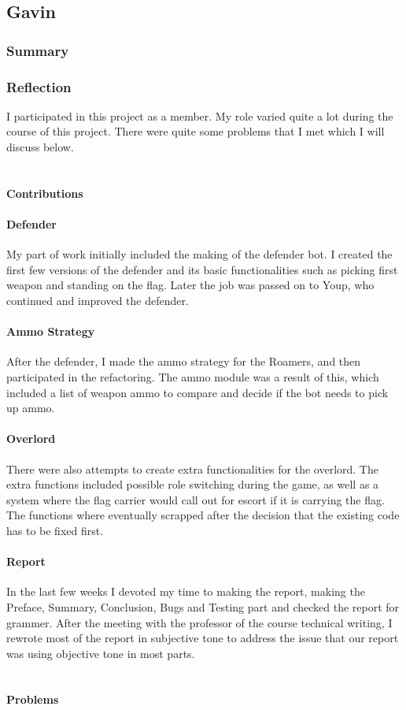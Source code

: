 \newpage
\subsection{Gavin}
\subsubsection{Summary}
\subsubsection{Reflection}
I participated in this project as a member. My role varied quite a lot during the course of this project. There were quite some problems that I met which I will discuss below.\\
\\
\\
\noindent
\textbf{Contributions}\\
\paragraph{Defender}
My part of work initially included the making of the defender bot. I created the first few versions of the defender and its basic functionalities such as picking first weapon and standing on the flag. Later the job was passed on to Youp, who continued and improved the defender.
\paragraph{Ammo Strategy}
After the defender, I made the ammo strategy for the Roamers, and then participated in the refactoring. The ammo module was a result of this, which included a list of weapon ammo to compare and decide if the bot needs to pick up ammo.
\paragraph{Overlord}
There were also attempts to create extra functionalities for the overlord. The extra functions included possible role switching during the game, as well as a system where the flag carrier would call out for escort if it is carrying the flag. The functions where eventually scrapped after the decision that the existing code has to be fixed first.
\paragraph{Report}
In the last few weeks I devoted my time to making the report, making the Preface, Summary, Conclusion, Bugs and Testing part and checked the report for grammer. After the meeting with the professor of the course technical writing, I rewrote most of the report in subjective tone to address the issue that our report was using objective tone in most parts.\\\\
\\
\noindent
\textbf{Problems}\\
